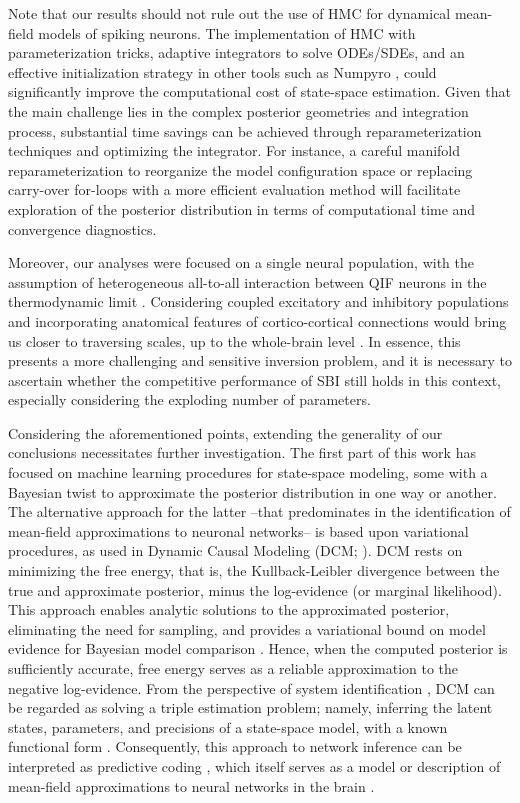 \documentclass[12pt]{article}
\begin{document}
Note that our results should not rule out the use of HMC for dynamical mean-field models of spiking neurons. The implementation of HMC with parameterization tricks, adaptive integrators to solve ODEs/SDEs, and an effective initialization strategy in other tools such as Numpyro \citep{phan2019}, could significantly improve the computational cost of state-space estimation. Given that the main challenge lies in the complex posterior geometries \citep{Betancourt2017} and integration process, substantial time savings can be achieved through reparameterization techniques and optimizing the integrator. For instance, a careful manifold reparameterization to reorganize the model configuration space or replacing carry-over for-loops with a more efficient evaluation method \citep{jax2018} will facilitate exploration of the posterior distribution in terms of computational time and convergence diagnostics.

Moreover, our analyses were focused on a single neural population, with the assumption of heterogeneous all-to-all interaction between QIF neurons in the thermodynamic limit \citep{Montbrio_Pazo_Roxin}. Considering coupled excitatory and inhibitory populations and incorporating anatomical features of cortico-cortical connections would bring us closer to traversing scales, up to the whole-brain level \citep{Hashemi2020, Hashemi2021}. In essence, this presents a more challenging and sensitive inversion problem, and it is necessary to ascertain whether the competitive performance of SBI still holds in this context, especially considering the exploding number of parameters.

Considering the aforementioned points, extending the generality of our conclusions necessitates further investigation.
The first part of this work has focused on machine learning procedures for state-space modeling, some with a Bayesian twist to approximate the posterior distribution in one way or another. 
The alternative approach for the latter --that predominates in the identification of mean-field approximations to neuronal networks-- is based upon variational procedures, as used in Dynamic Causal Modeling (DCM; \cite{Friston2003}). DCM rests on minimizing the free energy, that is, the Kullback-Leibler divergence between the true and approximate posterior, minus the log-evidence (or marginal likelihood). This approach enables analytic solutions to the approximated posterior, eliminating the need for sampling, and provides a variational bound on model evidence for Bayesian model comparison \citep{Penny2012, Zeidman2023}. Hence, when the computed posterior is sufficiently accurate, free energy serves as a reliable approximation to the negative log-evidence. From the perspective of system identification \citep{Linderman2017}, DCM can be regarded as solving a triple estimation problem; namely, inferring the latent states, parameters, and precisions of a state-space model, with a known functional form \citep{Friston2010, Schiff2008}. Consequently, this approach to network inference can be interpreted as predictive coding \citep{Millidge2020}, which itself serves as a model or description of mean-field approximations to neural networks in the brain \citep{Friston2009}.
\end{document}
